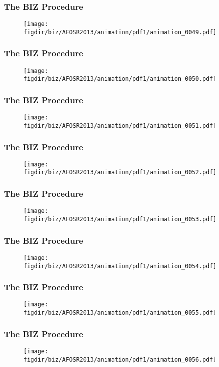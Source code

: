 \documentclass[13pt]{beamer}
\newcommand{\figdir}{../../fig}
\begin{document}
{\begin{frame}\frametitle{The BIZ Procedure}\begin{figure}\texttt{[image: \\figdir/biz/AFOSR2013/animation/pdf1/animation\_0049.pdf]}\end{figure}\end{frame}
\begin{frame}\frametitle{The BIZ Procedure}\begin{figure}\texttt{[image: \\figdir/biz/AFOSR2013/animation/pdf1/animation\_0050.pdf]}\end{figure}\end{frame}
\begin{frame}\frametitle{The BIZ Procedure}\begin{figure}\texttt{[image: \\figdir/biz/AFOSR2013/animation/pdf1/animation\_0051.pdf]}\end{figure}\end{frame}
\begin{frame}\frametitle{The BIZ Procedure}\begin{figure}\texttt{[image: \\figdir/biz/AFOSR2013/animation/pdf1/animation\_0052.pdf]}\end{figure}\end{frame}
\begin{frame}\frametitle{The BIZ Procedure}\begin{figure}\texttt{[image: \\figdir/biz/AFOSR2013/animation/pdf1/animation\_0053.pdf]}\end{figure}\end{frame}
\begin{frame}\frametitle{The BIZ Procedure}\begin{figure}\texttt{[image: \\figdir/biz/AFOSR2013/animation/pdf1/animation\_0054.pdf]}\end{figure}\end{frame}
\begin{frame}\frametitle{The BIZ Procedure}\begin{figure}\texttt{[image: \\figdir/biz/AFOSR2013/animation/pdf1/animation\_0055.pdf]}\end{figure}\end{frame}
\begin{frame}\frametitle{The BIZ Procedure}\begin{figure}\texttt{[image: \\figdir/biz/AFOSR2013/animation/pdf1/animation\_0056.pdf]}\end{figure}\end{frame}
}
\end{document}
